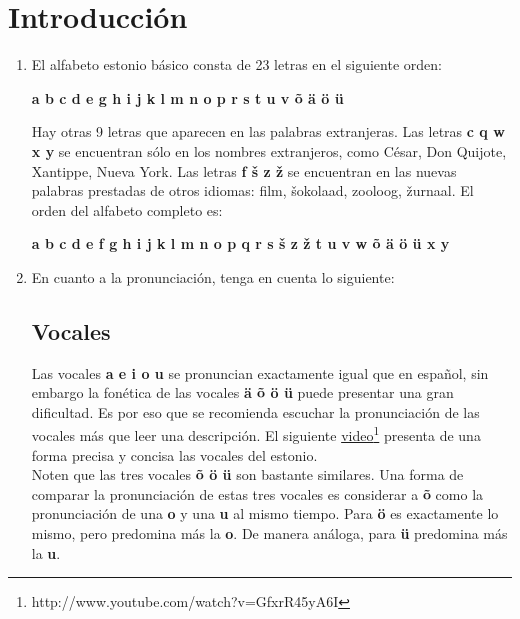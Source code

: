 

\chapter*{Introducción} %

\begin{enumerate}
	\item El alfabeto estonio básico consta de 23 letras en el siguiente orden:
	\begin{center}
	\begin{otherlanguage}{estonian}
		\textbf{a b c d e g h i j k l m n o p r s t u v õ ä ö ü}
	\end{otherlanguage}
	\end{center}

	Hay otras 9 letras que aparecen en las palabras extranjeras. Las letras \textbf{c q w x y} se encuentran sólo en los nombres extranjeros, como César, Don Quijote, Xantippe, Nueva York. Las letras \textbf{f š z ž} se encuentran en las nuevas palabras prestadas de otros idiomas: film, šokolaad, zooloog, žurnaal. El orden del alfabeto completo es:
	\begin{center}
	\begin{otherlanguage}{estonian}
		\textbf{a b c d e f g h i j k l m n o p q r s š z ž t u v w õ ä ö ü x y}
	\end{otherlanguage}
	\end{center}

	\item En cuanto a la pronunciación, tenga en cuenta lo siguiente:

	\section*{\Large{Vocales}}

	Las vocales \textbf{a e i o u} se pronuncian exactamente igual que en español, sin embargo la fonética de las vocales \textbf{ä õ ö ü} puede presentar una gran dificultad. Es por eso que se recomienda escuchar la pronunciación de las vocales más que leer una descripción. El siguiente \href{http://www.youtube.com/watch?v=GfxrR45yA6I}{video}\footnote{http://www.youtube.com/watch?v=GfxrR45yA6I} presenta de una forma precisa y concisa las vocales del estonio.\\

	Noten que las tres vocales \textbf{õ ö ü} son bastante similares. Una forma de comparar la pronunciación de estas tres vocales es considerar a \textbf{õ} como la pronunciación de una \textbf{o} y una \textbf{u} al mismo tiempo. Para \textbf{ö} es exactamente lo mismo, pero predomina más la \textbf{o}. De manera análoga, para \textbf{ü} predomina más la \textbf{u}.\\


\end{enumerate}
